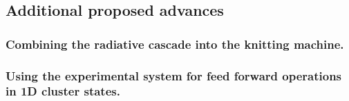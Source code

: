 \subsection{Additional proposed advances}
\subsubsection{Combining the radiative cascade into the knitting machine.}
\subsubsection{Using the experimental system for feed forward operations in 1D cluster states.}